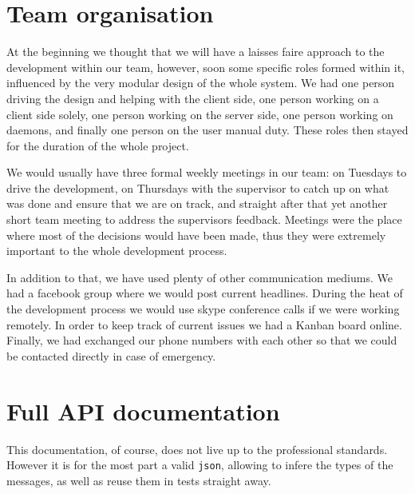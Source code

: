 \documentclass{l3proj}
\begin{document}
\begin{appendices}

\chapter{Team organisation}

At the beginning we thought that we will have a laisses faire approach to the development within our team, however, soon some specific roles formed within it, influenced by the very modular design of the whole system. We had one person driving the design and helping with the client side, one person working on a client side solely, one person working on the server side, one person working on daemons, and finally one person on the user manual duty. These roles then stayed for the duration of the whole project.

We would usually have three formal weekly meetings in our team: on Tuesdays to drive the development, on Thursdays with the supervisor to catch up on what was done and ensure that we are on track, and straight after that yet another short team meeting to address the supervisors feedback. Meetings were the place where most of the decisions would have been made, thus they were extremely important to the whole development process.

In addition to that, we have used plenty of other communication mediums. We had a facebook group where we would post current headlines. During the heat of the development process we would use skype conference calls if we were working remotely. In order to keep track of current issues we had a Kanban board online. Finally, we had exchanged our phone numbers with each other so that we could be contacted directly in case of emergency.




\chapter{Full API documentation}

This documentation, of course, does not live up to the professional standards. However it is for the most part a valid \texttt{json}, allowing to infere the types of the messages, as well as reuse them in tests straight away. 


\end{appendices}
\end{document}
